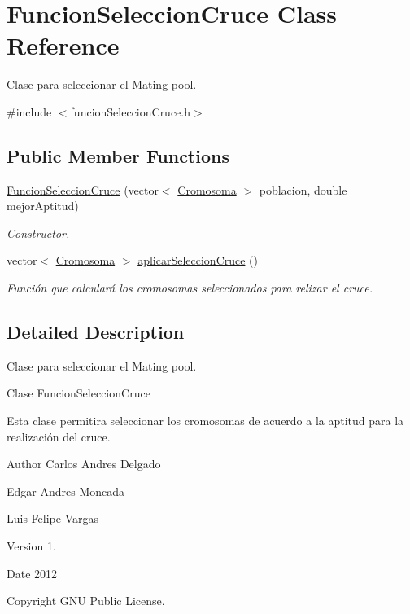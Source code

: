 \hypertarget{classFuncionSeleccionCruce}{\section{Funcion\-Seleccion\-Cruce Class Reference}
\label{classFuncionSeleccionCruce}
}


Clase para seleccionar el Mating pool.  




{\ttfamily \#include $<$funcion\-Seleccion\-Cruce.\-h$>$}

\subsection*{Public Member Functions}
\begin{DoxyCompactItemize}
\item 
\hyperlink{classFuncionSeleccionCruce_a22066e85dbf1ee971ff1433024ea3817}{Funcion\-Seleccion\-Cruce} (vector$<$ \hyperlink{classCromosoma}{Cromosoma} $>$ poblacion, double mejor\-Aptitud)
\begin{DoxyCompactList}\small\item\em Constructor. \end{DoxyCompactList}\item 
vector$<$ \hyperlink{classCromosoma}{Cromosoma} $>$ \hyperlink{classFuncionSeleccionCruce_a54ddbbce4b3bf60a646f28fab74b46e0}{aplicar\-Seleccion\-Cruce} ()
\begin{DoxyCompactList}\small\item\em Función que calculará los cromosomas seleccionados para relizar el cruce. \end{DoxyCompactList}\end{DoxyCompactItemize}


\subsection{Detailed Description}
Clase para seleccionar el Mating pool. 

\begin{DoxyVerb}Clase FuncionSeleccionCruce
\end{DoxyVerb}


Esta clase permitira seleccionar los cromosomas de acuerdo a la aptitud para la realización del cruce. \begin{DoxyAuthor}{Author}
Carlos Andres Delgado 

Edgar Andres Moncada 

Luis Felipe Vargas 
\end{DoxyAuthor}
\begin{DoxyVersion}{Version}
1. 
\end{DoxyVersion}
\begin{DoxyDate}{Date}
2012 
\end{DoxyDate}
\begin{DoxyCopyright}{Copyright}
G\-N\-U Public License. 
\end{DoxyCopyright}


